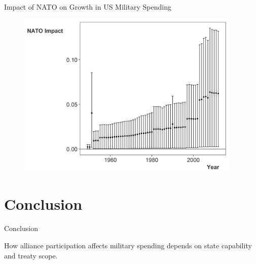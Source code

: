 \documentclass{beamer}
\begin{document}

\begin{frame}{Impact of NATO on Growth in US Military Spending} 

\begin{figure}
	\centering
		\includegraphics[width=0.95\textwidth]{nato-imp-us.png}
\end{figure}

\end{frame}



\section{Conclusion}


\begin{frame}{Conclusion}

How alliance participation affects military spending depends on state capability and treaty scope.  

\end{frame}


\end{document}
